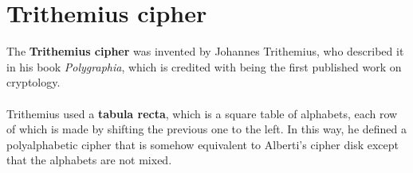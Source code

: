 \documentclass[Lau,binding=0.6cm,oneside]{sapthesis}
\begin{document}
\section{Trithemius cipher}
The \textbf{Trithemius cipher} was invented by Johannes Trithemius, who described it in his book \textit{Polygraphia}, which is credited with being the first published work on cryptology\supercite{trithemius}.\\\\
Trithemius used a \textbf{tabula recta}, which is a square table of alphabets, each row of which is made by shifting the previous one to the left. In this way, he defined a polyalphabetic cipher that is somehow equivalent to Alberti's cipher disk except that the alphabets are not mixed.\\\\
\end{document}
